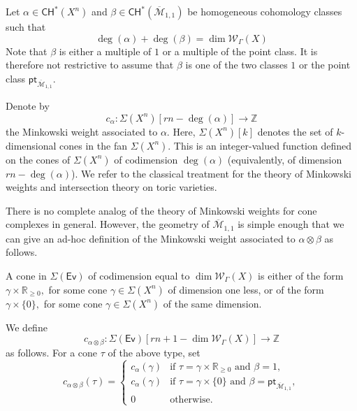 \documentclass{article}
\def\Ev{{\mathsf{Ev}}}
\def\oM{\overline{\mathcal{M}}}
\def\Z{\mathbb{Z}}
\def\R{\mathbb{R}}
\def\WG{\mathcal{W}_{\Gamma}}
\begin{document}
Let $\alpha \in \mathsf{CH}^*(X^n)$ and $\beta \in \mathsf{CH}^*(\overline{\mathcal{M}}_{1,1})$ be homogeneous cohomology classes such that 
\[
\deg(\alpha) + \deg(\beta)
= \dim \mathcal{W}_{\Gamma}(X)
\]
Note that $\beta$ is either a multiple of $1$ or a multiple of the point class. It is therefore not restrictive to assume that $\beta$ is one of the two classes $1$ or the point class $\mathsf{pt}_{\oM_{1,1}}$.

Denote by
\begin{equation*}\label{eqn: calpha}
c_{\alpha} \colon \Sigma(X^n)[rn-\deg(\alpha)]\longrightarrow \mathbb{Z}
\end{equation*}
the Minkowski weight associated to $\alpha$. Here, $\Sigma(X^n)[k]$ denotes the set of $k$-dimensional cones in the fan $\Sigma(X^n)$. This is an integer-valued function defined on the cones of $\Sigma(X^n)$ of codimension $\deg(\alpha)$ (equivalently, of dimension $rn-\deg(\alpha)$). We refer to the classical treatment \cite{FuSt} for the theory of Minkowski weights and intersection theory on toric varieties.

There is no complete analog of the theory of Minkowski weights for cone complexes in general. However, the geometry of $\overline{\mathcal{M}}_{1,1}$ is simple enough that we can give an ad-hoc definition of the Minkowski weight associated to $\alpha \otimes \beta$ as follows.

A cone in $\Sigma(\Ev)$ of codimension equal to $\dim \WG(X)$ is either of the form
$
\gamma \times \R_{\ge 0},
$
for some cone $\gamma \in \Sigma(X^n)$ of dimension one less, or of the form
$
\gamma \times \{0\},
$
for some cone $\gamma \in \Sigma(X^n)$ of the same dimension.

We define 
\[
c_{\alpha \otimes \beta} \colon \Sigma(\Ev)[rn+1 - \dim \WG(X)] \longrightarrow \Z
\]
as follows. For a cone $\tau$ of the above type, set
\begin{equation}\label{eqn: def of Minkowski weight c}
c_{\alpha \otimes \beta}(\tau) =
\begin{cases}
c_{\alpha}(\gamma) & \text{if } \tau = \gamma \times \R_{\ge 0}
\text{ and } \beta = 1, \\[6pt]
c_{\alpha}(\gamma) & \text{if } \tau = \gamma \times \{0\}
\text{ and } \beta = \mathsf{pt}_{\overline{\mathcal{M}}_{1,1}}, \\[6pt]
0 & \text{otherwise}.
\end{cases}
\end{equation}
\end{document}
